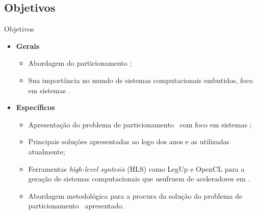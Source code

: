    
   \subsection{Objetivos}
      \begin{frame}{Objetivos}
      
         \begin{itemize} \setlength{\itemsep}{1.2em}
            \item \textbf{Gerais}
            \begin{itemize} \setlength{\itemsep}{0.6em}
               \item Abordagem do particionamento \hs;
               \item Sua importância no mundo de sistemas computacionais embutidos, foco em sistemas \wearables.
            \end{itemize}
            
            \item \textbf{Específicos}
            
            \begin{itemize} \setlength{\itemsep}{0.6em}
               \item Apresentação do problema de particionamento \hs\ com foco em sistemas \wearables;
               
               \item Principais soluções apresentadas ao logo dos anos e as utilizadas atualmente;
               
               \item  Ferramentas \textit{high-level syntesis} (HLS) como LegUp e OpenCL para a geração de sistemas computacionais que usufruem de aceleradores em \hardware.
               
               \item Abordagem metodológica para a procura da solução do problema de particionamento \hs\ apresentado.
            \end{itemize}
         \end{itemize}
         
      \end{frame}
      
